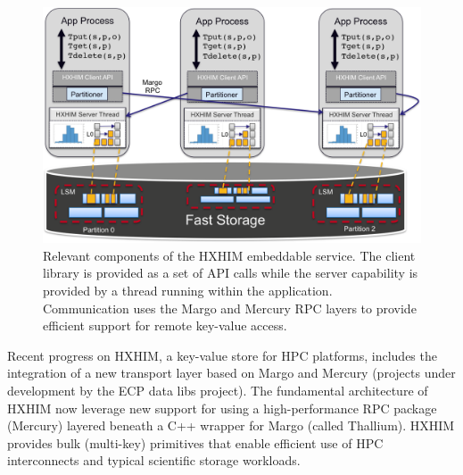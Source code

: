 \begin{figure}[htb]
	\centering
	\includegraphics[width=6in]{projects/2.3.6-NNSA/2.3.6.01-LANL-ATDM/hxhim-main}
	\caption{\label{fig:hxhim} Relevant components of the HXHIM
	embeddable service. The client library is provided as a set of API
	calls while the server capability is provided by a thread running
	within the application. Communication uses the Margo and Mercury RPC
	layers to provide efficient support for remote key-value access.}
\end{figure}

Recent progress on HXHIM, a key-value store for HPC platforms, includes the
integration of a new transport layer based on Margo and Mercury (projects
under development by the ECP data libs project). The fundamental architecture
of HXHIM now leverage new support for using a high-performance RPC package
(Mercury) layered beneath a C++ wrapper for Margo (called Thallium). HXHIM
provides bulk (multi-key) primitives that enable efficient use of HPC
interconnects and typical scientific storage workloads.

